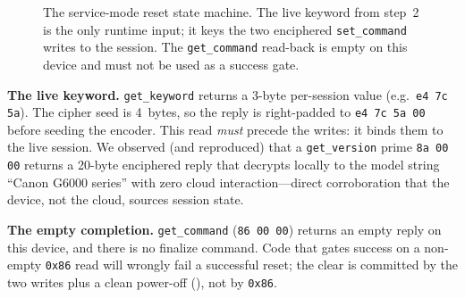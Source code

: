 \documentclass[conference]{IEEEtran}
\begin{document}
\begin{figure}[ht]
\centering
{}
\caption{The service-mode reset state machine. The live keyword from
step~2 is the only runtime input; it keys the two enciphered
\texttt{set\_command} writes to the session. The \texttt{get\_command}
read-back is empty on this device and must not be used as a success gate.}
\label{fig:statemachine}
\end{figure}

\noindent\textbf{The live keyword.} \texttt{get\_keyword} returns a
3-byte per-session value (e.g.\ \texttt{e4 7c 5a}). The cipher seed is
4~bytes, so the reply is right-padded to \texttt{e4 7c 5a 00} before
seeding the encoder. This read \emph{must} precede the writes: it binds
them to the live session. We observed (and reproduced) that a
\texttt{get\_version} prime \texttt{8a 00 00} returns a 20-byte enciphered
reply that decrypts locally to the model string ``Canon G6000 series''
with zero cloud interaction---direct corroboration that the device, not
the cloud, sources session state.

\noindent\textbf{The empty completion.} \texttt{get\_command}
(\texttt{86 00 00}) returns an empty reply on this device, and there is no
finalize command. Code that gates success on a non-empty \texttt{0x86}
read will wrongly fail a successful reset; the clear is committed by the
two writes plus a clean power-off (), not by
\texttt{0x86}.
\end{document}
